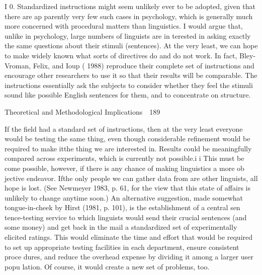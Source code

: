 \begin{styleStandard}
I 0. Standardized instructions might seem unlikely ever to be adopted, given that there are ap\- parently very few such cases in psychology, which is generally much more concerned with procedural matters than linguistics. I would argue that, unlike in psychology, large numbers of linguists are in\- terested in asking exactly the same questions about their stimuli (sentences). At the very least, we can hope to make widely known what sorts of directives do and do not work. In fact, Bley-Vroman, Felix, and Ioup ( 1988) reproduce their complete set of instructions and encourage other researchers to use it so that their results will be comparable. The instructions essentially ask the subjects to consider whether they feel the stimuli sound like possible English sentences for them, and to concentrate on structure.
\end{styleStandard}


\clearpage\setcounter{page}{1}\begin{styleStandard}
Theoretical and Methodological Implications\ \ 189
\end{styleStandard}


\begin{styleStandard}
If the field had a standard set of instructions, then at the very least everyone would be testing the same thing, even though considerable refinement would be required to make itthe thing we are interested in. Results could be meaningfully compared across experiments, which is currently not possible.i i This must be\- come possible, however, if there is any chance of making linguistics a more ob\- jective endeavor. Ifthe only people we can gather data from are other linguists, all hope is lost. (See Newmeyer 1983, p. 61, for the view that this state of affairs is unlikely to change anytime soon.) An alternative suggestion, made somewhat tongue-in-cheek by Hirst (1981, p. 101), is the establishment of a central sen\- tence-testing service to which linguists would send their crucial sentences (and some money) and get back in the mail a standardized set of experimentally elicited ratings. This would eliminate the time and effort that would be required to set up appropriate testing facilities in each department, ensure consistent proce\- dures, and reduce the overhead expense by dividing it among a larger user popu\- lation. Of course, it would create a new set of problems, too.
\end{styleStandard}


